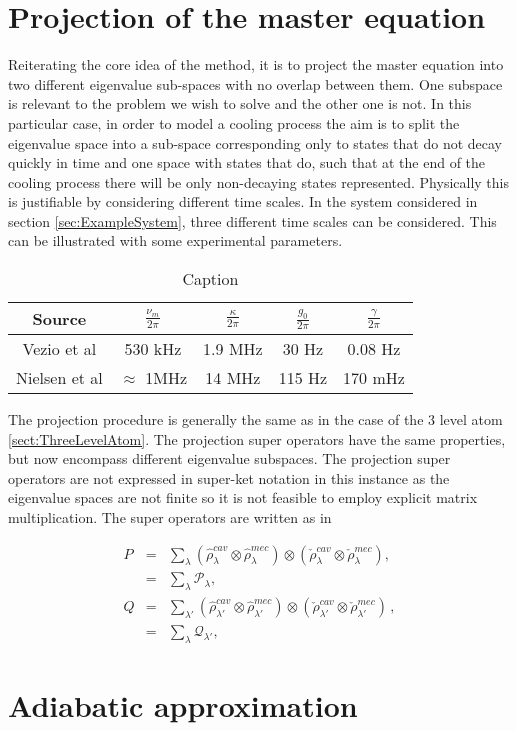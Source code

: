 \documentclass[12pt]{article}
\begin{document}
\section{Projection of the master equation}

Reiterating the core idea of the method, it is to project the master equation into two different eigenvalue sub-spaces with no overlap between them. One subspace is relevant to the problem we wish to solve and the other one is not. In this particular case, in order to model a cooling process the aim is to split the eigenvalue space into a sub-space corresponding only to states that do not decay quickly in time and one space with states that do, such that at the end of the cooling process there will be only non-decaying states represented. Physically this is justifiable by considering different time scales. In the system considered in section \ref{sec:ExampleSystem}, three different time scales can be considered. This can be illustrated with some experimental parameters.

\begin{table}[]
    \centering
    \begin{tabular}{|c|c|c|c|c|}
        \hline
        Source & $\frac{\nu_m}{2\pi}$ & $\frac{\kappa}{2\pi}$ & $\frac{g_0}{2\pi}$&  $\frac{\gamma}{2\pi}$  \\
        \hline\hline
        Vezio et al \cite{VezioOMExperiment2020} & 530 kHz & 1.9 MHz &  30 Hz & 0.08 Hz \\
        \hline
        Nielsen et al \cite{NielsenMultimodeOptomechanicalMembrane2017} & $\approx$ 1MHz & 14 MHz & 115 Hz & 170 mHz\\
        \hline
    \end{tabular}
    \caption{Caption}
    \label{tab:my_label}
\end{table}

The projection procedure is generally the same as in the case of the 3 level atom \ref{sect:ThreeLevelAtom}. The projection super operators have the same properties, but now encompass different eigenvalue subspaces. The projection super operators are not expressed in super-ket notation in this instance as the eigenvalue spaces are not finite so it is not feasible to employ explicit matrix multiplication. The super operators are written as in \cite{YanesOptomechanicalCooling2020}

\begin{eqnarray}
  P &=& \sum_{\lambda} (\hat{\rho}_{\lambda}^{cav}\otimes\hat{\rho}_{\lambda}^{mec})\otimes(\check{\rho}_{\lambda}^{cav}\otimes\check{\rho}_{\lambda}^{mec}),\label{eq:projector_p}\\
  &=& \sum_\lambda \mathcal{P}_\lambda, \nonumber\\
  Q &=& \sum_{\lambda'} (\hat{\rho}_{\lambda'}^{cav}\otimes \hat{\rho}_{\lambda'}^{mec})\otimes(\check{\rho}_{\lambda'}^{cav}\otimes\check{\rho}_{\lambda'}^{mec})\label{eq:projector_q}\, ,\\
  &=& \sum_\lambda \mathcal{Q}_{\lambda'}, \nonumber
\end{eqnarray}

\section{Adiabatic approximation}



\end{document}
